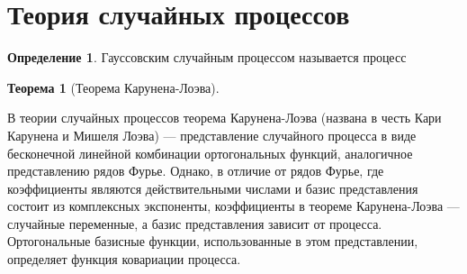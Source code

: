 \documentclass{book}
\newtheorem{theorem}{Теорема}
\numberwithin{theorem}{chapter}
\numberwithin{statement}{chapter}
\numberwithin{lemma}{chapter}
\theoremstyle{definition}
\numberwithin{task}{chapter}
\theoremstyle{remark}
\numberwithin{example}{chapter}
\theoremstyle{definition}
\newtheorem{definition}{Определение}
\numberwithin{definition}{chapter}
\theoremstyle{remark}
\theoremstyle{remark}
\numberwithin{lyrics}{section}
\begin{document}
\section{Теория случайных процессов}
\begin{definition}
	Гауссовским случайным процессом называется процесс
\end{definition}

\begin{theorem}[Теорема Карунена-Лоэва]
\end{theorem}
В теории случайных процессов теорема Карунена-Лоэва (названа в честь Кари Карунена и Мишеля Лоэва) --- представление случайного процесса в виде бесконечной линейной комбинации ортогональных функций, аналогичное представлению рядов Фурье. Однако, в отличие от рядов Фурье, где коэффициенты являются действительными числами и базис представления состоит из комплексных экспоненты, коэффициенты в теореме Карунена-Лоэва --- случайные переменные, а базис представления зависит от процесса. Ортогональные базисные функции, использованные в этом представлении, определяет функция ковариации процесса. 


%
%
\end{document}
